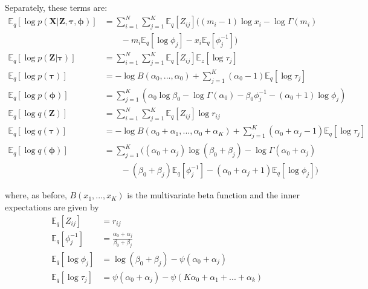 \documentclass{article}
\let\vec\boldsymbol
\begin{document}
Separately, these terms are:
\begin{align*}
    \mathbb{E}_{q} \left[ \log p \left( \vec{X} | \vec{Z}, \boldsymbol{\tau}, \boldsymbol{\phi} \right) \right] &= \sum\limits_{i=1}^{N} \sum\limits_{j=1}^{K} \mathbb{E}_{q} \left[ Z_{ij} \right] \Big(
        (m_{i} - 1) \log x_{i} - \log \Gamma (m_{i}) \\
    &\qquad - m_{i} \mathbb{E}_{q} \left[ \log \phi_{j} \right] - x_{i} \mathbb{E}_{q} \left[ \phi_{j}^{-1} \right] \Big) \\
    \mathbb{E}_{q} \left[ \log p \left( \vec{Z} | \boldsymbol{\tau} \right) \right] &= \sum\limits_{i=1}^{N} \sum\limits_{j=1}^{K} \mathbb{E}_{q} \left[ Z_{ij} \right] \mathbb{E}_{z} \left[ \log \tau_{j} \right] \\
    \mathbb{E}_{q} \left[ \log p \left( \boldsymbol{\tau} \right) \right] &= - \log B (\alpha_{0}, ..., \alpha_{0}) + \sum\limits_{j=1}^{K} (\alpha_{0} - 1) \mathbb{E}_{q} \left[ \log \tau_{j} \right] \\
    \mathbb{E}_{q} \left[ \log p \left( \boldsymbol{\phi} \right) \right] &= \sum\limits_{j=1}^{K} \left(
        \alpha_{0} \log \beta_{0} - \log \Gamma (\alpha_{0}) - \beta_{0} \phi_{j}^{-1} - (\alpha_{0} + 1) \log \phi_{j}
    \right) \\
    \mathbb{E}_{q} \left[ \log q \left( \vec{Z} \right) \right] &= \sum\limits_{i=1}^{N} \sum\limits_{j=1}^{K} \mathbb{E}_{q} \left[ Z_{ij} \right] \log r_{ij} \\
    \mathbb{E}_{q} \left[ \log q \left( \boldsymbol{\tau} \right) \right] &= - \log B (\alpha_{0} + \alpha_{1}, ..., \alpha_{0} + \alpha_{K} ) + \sum\limits_{j=1}^{K} (\alpha_{0} + \alpha_{j} - 1) \mathbb{E}_{q} \left[ \log \tau_{j} \right] \\
    \mathbb{E}_{q} \left[ \log q \left( \boldsymbol{\phi} \right) \right] &= \sum\limits_{j=1}^{K} \Big(
        (\alpha_{0} + \alpha_{j}) \log (\beta_{0} + \beta_{j}) - \log \Gamma (\alpha_{0} + \alpha_{j}) \\
    &\qquad - (\beta_{0} + \beta_{j}) \mathbb{E}_{q} \left[ \phi_{j}^{-1} \right] - (\alpha_{0} + \alpha_{j} + 1) \mathbb{E}_{q} \left[ \log \phi_{j} \right] 
    \Big)
\end{align*}

where, as before, $B(x_{1}, ..., x_{K})$ is the multivariate beta function and the inner expectations are given by
\begin{align*}
    \mathbb{E}_{q} \left[ Z_{ij} \right] &= r_{ij} \\
    \mathbb{E}_{q} \left[ \phi_{j}^{-1} \right] &= \frac{\alpha_{0} + \alpha_{j}}{\beta_{0} + \beta_{j}} \\
    \mathbb{E}_{q} \left[ \log \phi_{j} \right] &= \log (\beta_{0} + \beta_{j}) - \psi (\alpha_{0} + \alpha_{j}) \\
    \mathbb{E}_{q} \left[ \log \tau_{j} \right] &= \psi (\alpha_{0} + \alpha_{j}) - \psi (K \alpha_{0} + \alpha_{1} + ... + \alpha_{k} )
\end{align*}
\end{document}
